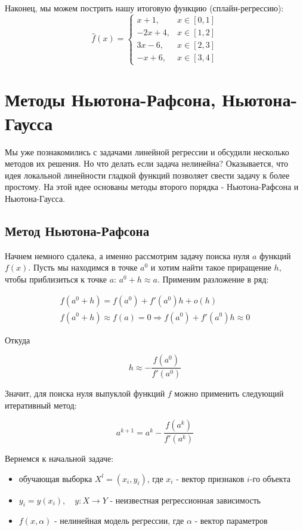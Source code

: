 {Наконец, мы можем пострить нашу итоговую функцию (сплайн-регрессию):
\[
\hat{f}(x) =
\begin{cases}
x + 1, & x \in [0, 1] \\
-2x + 4, & x \in [1, 2] \\
3x - 6, & x \in [2, 3] \\
-x + 6, & x \in [3, 4]
\end{cases}
\]






\section*{Методы Ньютона-Рафсона, Ньютона-Гаусса}

Мы уже познакомились с задачами линейной регрессии и обсудили несколько методов их решения. Но что делать если задача нелинейна? Оказывается, что идея локальной линейности гладкой функций позволяет свести задачу к более простому. На этой идее основаны методы второго порядка - Ньютона-Рафсона и Ньютона-Гаусса.

\subsection*{Метод Ньютона-Рафсона}

Начнем немного сдалека, а именно рассмотрим задачу поиска нуля $a$ функций $f(x)$. Пусть мы находимся в точке $a^{0}$ и хотим найти такое приращение $h$, чтобы приблизиться к точке $a$: $a^{0} + h \approx a$. Применим разложение в ряд:

\begin{gather*}
    f(a^{0} + h) = f(a^{0}) + f'(a^{0})h + o(h)\\[1em]
    f(a^{0} + h) \approx f(a) = 0 \Rightarrow f(a^{0}) + f'(a^{0})h \approx 0
\end{gather*}

Откуда

\[
h \approx - \frac{f(a^{0})}{f'(a^{0})}
\]

Значит, для поиска нуля выпуклой функций \( f \) можно применить следующий итеративный метод:

\[
a^{k + 1} = a^{k} - \frac{f(a^{k})}{f'(a^k)}
\]

Вернемся к начальной задаче:

\begin{itemize}
    \item обучающая выборка \( X^{l} = (x_{i}, y_{i}) \), где \( x_{i} \) - вектор признаков \( i \)-го объекта
    \item \( y_{i} = y(x_{i}),\quad y: X \to Y \) - неизвестная регрессионная зависимость
    \item \( f(x, \alpha) \) - нелинейная модель регрессии, где \( \alpha \) - вектор параметров
\end{itemize}

}
